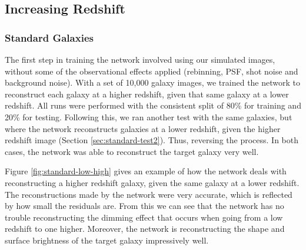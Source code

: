 \documentclass[fleqn,usenatbib]{mnras}
\begin{document}
\subsection{Increasing Redshift} \label{sec:increasing-redshift}
\subsubsection{Standard Galaxies} \label{sec:standard-test}
The first step in training the network involved using our simulated images, without some of the observational effects applied (rebinning, PSF, shot noise and background noise). With a set of 10,000 galaxy images, we trained the network to reconstruct each galaxy at a higher redshift, given that same galaxy at a lower redshift. All runs were performed with the consistent split of 80\% for training and 20\% for testing. Following this, we ran another test with the same galaxies, but where the network reconstructs galaxies at a lower redshift, given the higher redshift image (Section \ref{sec:standard-test2}). Thus, reversing the process. In both cases, the network was able to reconstruct the target galaxy very well.

Figure \ref{fig:standard-low-high} gives an example of how the network deals with reconstructing a higher redshift galaxy, given the same galaxy at a lower redshift. The reconstructions made by the network were very accurate, which is reflected by how small the residuals are. From this we can see that the network has no trouble reconstructing the dimming effect that occurs when going from a low redshift to one higher. Moreover, the network is reconstructing the shape and surface brightness of the target galaxy impressively well.
\end{document}
